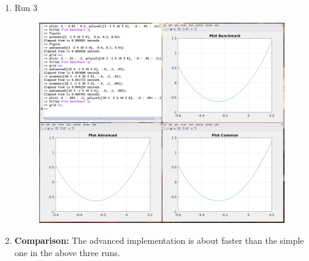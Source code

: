 \documentclass[12pt,a4paper]{article}
\begin{document}
\begin{enumerate}[leftmargin=!,labelindent=5pt]
	\item Run 3
		\begin{figure}[H]
			\centering
			\includegraphics[scale=0.45]{./img/poly_comp_03.png}
		\end{figure}

	\item \textbf{Comparison:}
		\newline
		\newline The advanced implementation is about faster than the simple one
		in the above three runs.
\end{enumerate}
\newpage
\end{document}
